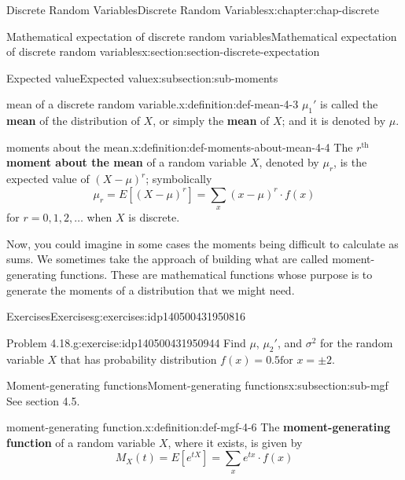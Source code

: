 \documentclass[oneside,10pt,]{book}
\newcommand{\terminology}[1]{\textbf{#1}}
\begin{document}
\begin{chapterptx}{Discrete Random Variables}{}{Discrete Random Variables}{}{}{x:chapter:chap-discrete}
\begin{sectionptx}{Mathematical expectation of discrete random variables}{}{Mathematical expectation of discrete random variables}{}{}{x:section:section-discrete-expectation}
\begin{subsectionptx}{Expected value}{}{Expected value}{}{}{x:subsection:sub-moments}
\begin{definition}{mean of a discrete random variable.}{x:definition:def-mean-4-3}
\(\displaystyle \mu_1'\) is called the \terminology{mean} of the distribution of \(X\), or simply the \terminology{mean} of \(X\); and it is denoted by \(\displaystyle
\mu\).\end{definition}
\begin{definition}{moments about the mean.}{x:definition:def-moments-about-mean-4-4}%
The \(\displaystyle r^\text{th}\) \terminology{moment about the mean} of a random variable \(X\), denoted by \(\displaystyle \mu_r\), is the expected value of \(\displaystyle
(X-\mu)^r\); symbolically%
\begin{equation*}
\mu_r=E[(X-\mu)^r] = \sum_x (x-\mu)^r\cdot f(x)
\end{equation*}
for \(\displaystyle r =
0,1,2, \dots\) when \(X\) is discrete.%
\end{definition}
Now, you could imagine in some cases the moments being difficult to calculate as sums. We sometimes take the approach of building what are called moment-generating functions. These are mathematical functions whose purpose is to generate the moments of a distribution that we might need.%
\end{subsectionptx}
%
%
\typeout{************************************************}
\typeout{************************************************}
%
\begin{exercises-subsection}{Exercises}{}{Exercises}{}{}{g:exercises:idp140500431950816}
\begin{divisionexercise}{1}{Problem 4.18.}{}{g:exercise:idp140500431950944}%
Find \(\mu\), \(\mu_2'\), and \(\sigma^2\) for the random variable \(X\) that has probability distribution \(f(x) = 0.5 \text{
for } x= \pm 2\).%
\end{divisionexercise}%
\end{exercises-subsection}
%
%
\typeout{************************************************}
\typeout{************************************************}
%
\begin{subsectionptx}{Moment-generating functions}{}{Moment-generating functions}{}{}{x:subsection:sub-mgf}
See section 4.5.%
\begin{definition}{moment-generating function.}{x:definition:def-mgf-4-6}%
The \terminology{moment-generating function} of a random variable \(X\), where it exists, is given by%
\begin{equation*}
\displaystyle
M_X(t) = E[e^{tX}] = \sum_x e^{tx}\cdot f(x)
\end{equation*}

\end{definition}
\end{subsectionptx}
\end{sectionptx}
\end{chapterptx}
\end{document}
